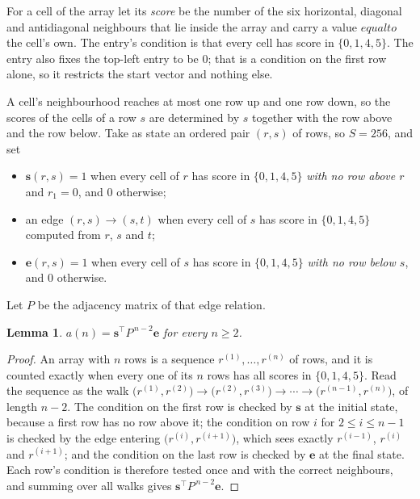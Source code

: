 \documentclass[11pt,a4paper]{article}
\theoremstyle{plain}
\newtheorem{lemma}[theorem]{Lemma}
\theoremstyle{definition}
\begin{document}
For a cell of the array let its \emph{score} be the number of the six horizontal, diagonal and antidiagonal neighbours that lie inside
the array and carry a value $equal to$ the cell's own. The entry's condition is that every cell
has score in $\{0,1,4,5\}$. The entry also fixes the top-left entry to be $0$; that is a condition on the first row alone, so it restricts the start vector and nothing else.

A cell's neighbourhood reaches at most one row up and one row down, so the scores of the
cells of a row $s$ are determined by $s$ together with the row above and the row below.
Take as state an ordered pair $(r,s)$ of rows, so $S=256$, and set
\begin{itemize}
\item $\mathbf{s}(r,s)=1$ when every cell of $r$ has score in $\{0,1,4,5\}$ \emph{with no row
above $r$} and $r_1=0$, and $0$ otherwise;
\item an edge $(r,s)\to(s,t)$ when every cell of $s$ has score in $\{0,1,4,5\}$ computed from
$r$, $s$ and $t$;
\item $\mathbf{e}(r,s)=1$ when every cell of $s$ has score in $\{0,1,4,5\}$ \emph{with no row
below $s$}, and $0$ otherwise.
\end{itemize}
Let $P$ be the adjacency matrix of that edge relation.

\begin{lemma}\label{lem:walk}
$a(n)=\mathbf{s}^{\!\top}P^{\,n-2}\mathbf{e}$ for every $n\ge2$.
\end{lemma}

\begin{proof}
An array with $n$ rows is a sequence $r^{(1)},\dots,r^{(n)}$ of rows, and it is counted
exactly when every one of its $n$ rows has all scores in $\{0,1,4,5\}$. Read the sequence as the
walk $\bigl(r^{(1)},r^{(2)}\bigr)\to\bigl(r^{(2)},r^{(3)}\bigr)\to\cdots\to
\bigl(r^{(n-1)},r^{(n)}\bigr)$, of length $n-2$. The condition on the first row is
checked by $\mathbf{s}$ at the initial state, because a first row has no row above it; the
condition on row $i$ for $2\le i\le n-1$ is checked by the edge entering
$\bigl(r^{(i)},r^{(i+1)}\bigr)$, which sees exactly $r^{(i-1)}$, $r^{(i)}$ and
$r^{(i+1)}$; and the condition on the last row is checked by $\mathbf{e}$ at the final
state. Each row's condition is therefore tested once and with the correct neighbours, and
summing over all walks gives $\mathbf{s}^{\!\top}P^{\,n-2}\mathbf{e}$.
\end{proof}
\end{document}
